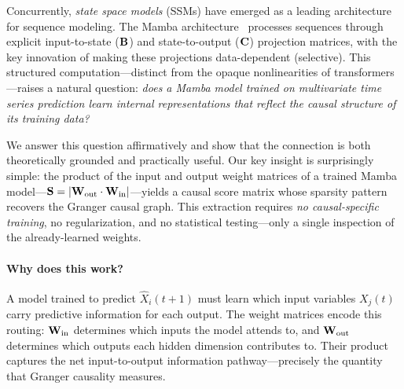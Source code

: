 Concurrently, \emph{state space models} (SSMs) have emerged as a leading
architecture for sequence modeling. The Mamba
architecture~\citep{gu2023mamba} processes sequences through explicit
input-to-state ($\mathbf{B}$) and state-to-output ($\mathbf{C}$) projection matrices,
with the key innovation of making these projections data-dependent
(selective). This structured computation---distinct from the opaque
nonlinearities of transformers---raises a natural question: \emph{does a
Mamba model trained on multivariate time series prediction learn internal
representations that reflect the causal structure of its training data?}

We answer this question affirmatively and show that the connection is both
theoretically grounded and practically useful. Our key insight is
surprisingly simple: the product of the input and output weight matrices
of a trained Mamba model---$\mathbf{S} = |\mathbf{W}_{\text{out}} \cdot \mathbf{W}_{\text{in}}|$---yields
a causal score matrix whose sparsity pattern recovers the Granger causal
graph. This extraction requires \emph{no causal-specific training}, no
regularization, and no statistical testing---only a single inspection of
the already-learned weights.

\paragraph{Why does this work?} A model trained to predict $\hat{X}_i(t+1)$
must learn which input variables $X_j(t)$ carry predictive information for
each output. The weight matrices encode this routing: $\mathbf{W}_{\text{in}}$
determines which inputs the model attends to, and $\mathbf{W}_{\text{out}}$
determines which outputs each hidden dimension contributes to. Their
product captures the net input-to-output information pathway---precisely
the quantity that Granger causality measures.

